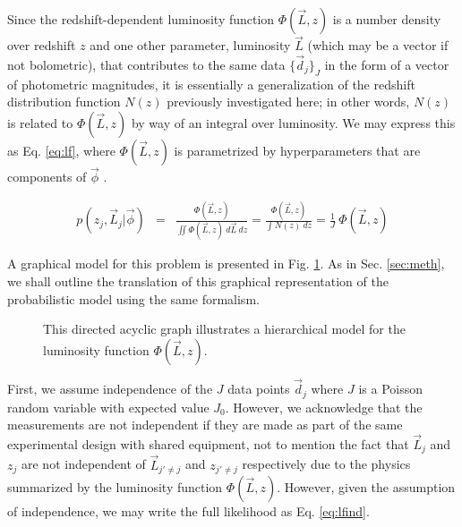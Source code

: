 \documentclass[preprint]{aastex}
\begin{document}
Since the redshift-dependent luminosity function $\Phi(\vec{L},z)$ is a number density over redshift $z$ and one other parameter, luminosity $\vec{L}$ (which may be a vector if not bolometric), that contributes to the same data $\{\vec{d}_{j}\}_{J}$ in the form of a vector of photometric magnitudes, it is essentially a generalization of the redshift distribution function $N(z)$ previously investigated here; in other words, $N(z)$ is related to $\Phi(\vec{L},z)$ by way of an integral over luminosity.   We may express this as Eq. \ref{eq:lf}, where $\Phi(\vec{L},z)$ is parametrized by hyperparameters that are components of $\vec{\phi}$ .

\begin{eqnarray}
\label{eq:lf}
p(z_{j},\vec{L}_{j}|\vec{\phi}) &=& \frac{\Phi(\vec{L},z)}{\iint \Phi(\vec{L},z)\ d\vec{L}\ dz} = \frac{\Phi(\vec{L},z)}{\int N(z)\ dz} = \frac{1}{J}\ \Phi(\vec{L},z)
\end{eqnarray}

A graphical model for this problem is presented in Fig. \ref{fig:lf}.  As in Sec. \ref{sec:meth}, we shall outline the translation of this graphical representation of the probabilistic model using the same formalism.

\begin{figure}
\vspace{0.5cm}
\begin{center}
\caption{This directed acyclic graph illustrates a hierarchical model for the luminosity function $\Phi(\vec{L},z)$.}
\label{fig:lf}
\end{center}
\end{figure}

First, we assume independence of the $J$ data points $\vec{d}_{j}$ where $J$ is a Poisson random variable with expected value $J_{0}$.  However, we acknowledge that the measurements are not independent if they are made as part of the same experimental design with shared equipment, not to mention the fact that $\vec{L}_{j}$ and $z_{j}$ are not independent of $\vec{L}_{j'\neq j}$ and $z_{j'\neq j}$ respectively due to the physics summarized by the luminosity function $\Phi(\vec{L},z)$.  However, given the assumption of independence, we may write the full likelihood as Eq. \ref{eq:lfind}.  
\end{document}

